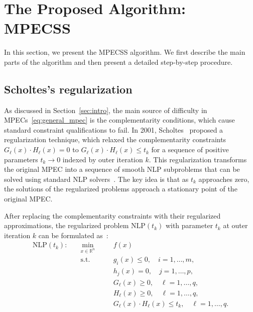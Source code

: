 \section{The Proposed Algorithm: MPECSS}
\label{sec:algorithm}
In this section, we present the MPECSS algorithm.
We first describe the main parts of the algorithm and then present a detailed step-by-step procedure.

\subsection{Scholtes's regularization}
\label{sec:scholtes}
As discussed in Section~\ref{sec:intro}, the main source of difficulty in MPECs~\eqref{eq:general_mpec} is the complementarity conditions, which cause standard constraint qualifications to fail. In 2001, Scholtes~\cite{Scholtes2001} proposed a regularization technique, which relaxed the complementarity constraints $G_\ell(x) \cdot H_\ell(x) = 0$ to $G_\ell(x) \cdot H_\ell(x) \leq t_k$ for a sequence of positive parameters $t_k \to 0$ indexed by outer iteration $k$. This regularization transforms the original MPEC into a sequence of smooth NLP subproblems that can be solved using standard NLP solvers~\cite{FletcherLeyffer2004}. The key idea is that as $t_k$ approaches zero, the solutions of the regularized problems approach a stationary point of the original MPEC.

After replacing the complementarity constraints with their regularized approximations, the regularized problem $\text{NLP}(t_k)$ with parameter $t_k$ at outer iteration $k$ can be formulated as~\cite{Scholtes2001}:
\begin{equation}
\begin{aligned}
  \text{NLP}(t_k): \quad & \min_{x \in \mathbb{R}^n} \quad && f(x) \\
  & \text{s.t.} \quad && g_i(x) \leq 0, \quad i = 1, \ldots, m, \\
  & && h_j(x) = 0, \quad j = 1, \ldots, p, \\
  & && G_\ell(x) \ge 0, \quad \ell = 1, \ldots, q, \\
  & && H_\ell(x) \ge 0, \quad \ell = 1, \ldots, q, \\
  & && G_\ell(x) \cdot H_\ell(x) \leq t_k, \quad \ell = 1, \ldots, q.
\end{aligned}
\label{eq:nlp}
\end{equation}

